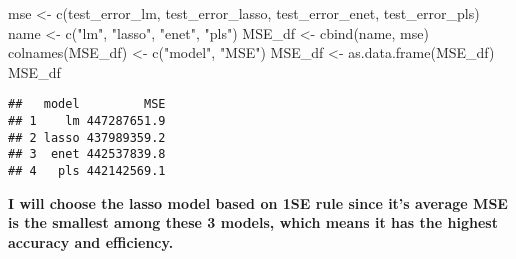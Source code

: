 \documentclass[
]{article}
\newenvironment{Shaded}{\begin{snugshade}}{\end{snugshade}}
\newcommand{\FunctionTok}[1]{\textcolor[rgb]{0.00,0.00,0.00}{#1}}
\newcommand{\NormalTok}[1]{#1}
\newcommand{\OtherTok}[1]{\textcolor[rgb]{0.56,0.35,0.01}{#1}}
\newcommand{\StringTok}[1]{\textcolor[rgb]{0.31,0.60,0.02}{#1}}
\begin{document}
\begin{Shaded}
\begin{Highlighting}[]
\NormalTok{mse }\OtherTok{\textless{}{-}} \FunctionTok{c}\NormalTok{(test\_error\_lm, test\_error\_lasso, test\_error\_enet, test\_error\_pls)}
\NormalTok{name }\OtherTok{\textless{}{-}} \FunctionTok{c}\NormalTok{(}\StringTok{"lm"}\NormalTok{, }\StringTok{"lasso"}\NormalTok{, }\StringTok{"enet"}\NormalTok{, }\StringTok{"pls"}\NormalTok{)}
\NormalTok{MSE\_df }\OtherTok{\textless{}{-}} \FunctionTok{cbind}\NormalTok{(name, mse)}
\FunctionTok{colnames}\NormalTok{(MSE\_df) }\OtherTok{\textless{}{-}} \FunctionTok{c}\NormalTok{(}\StringTok{"model"}\NormalTok{, }\StringTok{"MSE"}\NormalTok{)}
\NormalTok{MSE\_df }\OtherTok{\textless{}{-}} \FunctionTok{as.data.frame}\NormalTok{(MSE\_df)}
\NormalTok{MSE\_df}
\end{Highlighting}
\end{Shaded}

\begin{verbatim}
##   model         MSE
## 1    lm 447287651.9
## 2 lasso 437989359.2
## 3  enet 442537839.8
## 4   pls 442142569.1
\end{verbatim}

\textbf{I will choose the lasso model based on 1SE rule since it's
average MSE is the smallest among these 3 models, which means it has the
highest accuracy and efficiency.}
\end{document}

